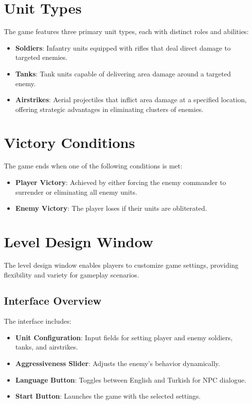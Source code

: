 \section{Unit Types}
The game features three primary unit types, each with distinct roles and abilities:
\begin{itemize}
    \item \textbf{Soldiers}: Infantry units equipped with rifles that deal direct damage to targeted enemies.
    \item \textbf{Tanks}: Tank units capable of delivering area damage around a targeted enemy.
    \item \textbf{Airstrikes}: Aerial projectiles that inflict area damage at a specified location, offering strategic advantages in eliminating clusters of enemies.
\end{itemize}

\section{Victory Conditions}
The game ends when one of the following conditions is met:
\begin{itemize}
    \item \textbf{Player Victory}: Achieved by either forcing the enemy commander to surrender or eliminating all enemy units.

    \item \textbf{Enemy Victory}: The player loses if their units are obliterated.
\end{itemize}

\section{Level Design Window}
The level design window enables players to customize game settings, providing flexibility and variety for gameplay scenarios.

\subsection{Interface Overview}
The interface includes:
\begin{itemize}
    \item \textbf{Unit Configuration}: Input fields for setting player and enemy soldiers, tanks, and airstrikes.
    \item \textbf{Aggressiveness Slider}: Adjusts the enemy's behavior dynamically.
    \item \textbf{Language Button}: Toggles between English and Turkish for NPC dialogue.
    \item \textbf{Start Button}: Launches the game with the selected settings.
\end{itemize}

